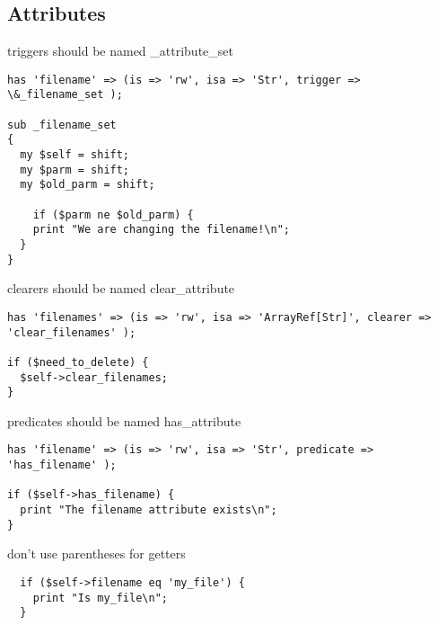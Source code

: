 \subsection{Attributes}
triggers should be named \_attribute\_set
\begin{verbatim}
has 'filename' => (is => 'rw', isa => 'Str', trigger => \&_filename_set );

sub _filename_set
{
  my $self = shift;
  my $parm = shift;
  my $old_parm = shift;

	if ($parm ne $old_parm) {
    print "We are changing the filename!\n";
  }
}
\end{verbatim}

clearers should be named clear\_attribute
\begin{verbatim}
has 'filenames' => (is => 'rw', isa => 'ArrayRef[Str]', clearer => 'clear_filenames' );

if ($need_to_delete) {
  $self->clear_filenames;
}
\end{verbatim}

predicates should be named has\_attribute
\begin{verbatim}
has 'filename' => (is => 'rw', isa => 'Str', predicate => 'has_filename' );

if ($self->has_filename) {
  print "The filename attribute exists\n";
}
\end{verbatim}

don't use parentheses for getters
\begin{verbatim}
  if ($self->filename eq 'my_file') {
    print "Is my_file\n";
  }
\end{verbatim}


